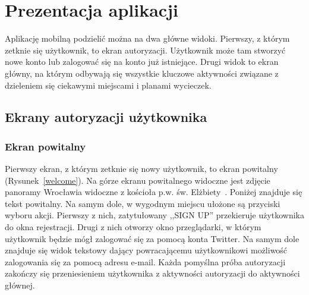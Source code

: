 \newpage
\section{Prezentacja aplikacji}
    Aplikację mobilną podzielić można na dwa główne widoki. Pierwszy, z którym zetknie się użytkownik, to ekran autoryzacji. Użytkownik może tam stworzyć nowe konto lub zalogować się
    na konto już istniejące. Drugi widok to ekran główny, na którym odbywają się wszystkie kluczowe aktywności związane z  dzieleniem się 
    ciekawymi miejscami i planami wycieczek.

    \subsection{Ekrany autoryzacji użytkownika}
        \subsubsection{Ekran powitalny}
        Pierwszy ekran, z którym zetknie się nowy użytkownik, to ekran powitalny (Rysunek~\ref{welcome}). Na górze ekranu powitalnego widoczne jest zdjęcie panoramy
        Wrocławia widoczne z kościoła p.w. św. Elżbiety~\cite{RYNEK}. Poniżej znajduje się tekst powitalny. Na samym dole, w wygodnym  miejscu ułożone są przyciski wyboru akcji.
        Pierwszy z nich, zatytułowany ,,SIGN UP'' przekieruje użytkownika do okna rejestracji. Drugi z nich otworzy okno przeglądarki, w którym użytkownik będzie mógł zalogować się za pomocą
        konta Twitter. Na samym dole znajduje się widok tekstowy dający powracającemu użytkownikowi możliwość zalogowania się za pomocą adresu e-mail. Każda pomyślna próba autoryzacji
        zakończy się przeniesieniem użytkownika z aktywności autoryzacji do  aktywności głównej.

